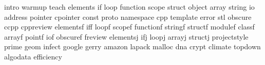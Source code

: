 intro
warmup
teach
elements
if
loop
function
scope
struct
object
array
string
io
address
pointer
cpointer
const
proto
namespace
cpp
template
error
stl
obscure
ccpp
cppreview
elementsf
iff
loopf
scopef
functionf
stringf
structf
modulef
classf
arrayf
pointf
iof
obscuref
freview
elementsj
ifj
loopj
arrayj
structj
projectstyle
prime
geom
infect
google
gerry
amazon
lapack
malloc
dna
crypt
climate
topdown
algodata
efficiency
